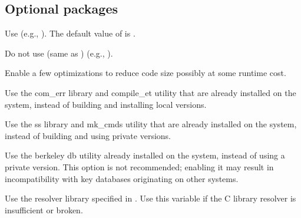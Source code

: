 \documentclass[letterpaper,10pt,english]{sphinxmanual}
\begin{document}
\subsection{Optional packages}
\label{\detokenize{build/options2configure:optional-packages}}\begin{description}
\sphinxAtStartPar
Use  (e.g., ).  The default value of 
is .

\sphinxAtStartPar
Do not use  (same as )
(e.g., ).

\sphinxAtStartPar
Enable a few optimizations to reduce code size possibly at some
run\sphinxhyphen{}time cost.

\sphinxAtStartPar
Use the com\_err library and compile\_et utility that are already
installed on the system, instead of building and installing
local versions.

\sphinxAtStartPar
Use the ss library and mk\_cmds utility that are already installed
on the system, instead of building and using private versions.

\sphinxAtStartPar
Use the berkeley db utility already installed on the system,
instead of using a private version.  This option is not
recommended; enabling it may result in incompatibility with key
databases originating on other systems.

\sphinxAtStartPar
Use the resolver library specified in .  Use this variable
if the C library resolver is insufficient or broken.


\end{description}
\end{document}
